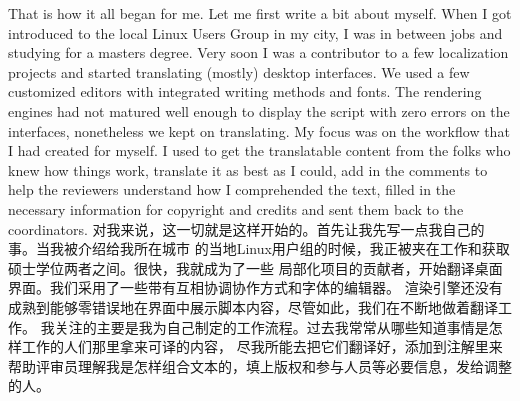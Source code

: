 That is how it all began for me. Let me first write a bit about myself. When I
got introduced to the local Linux Users Group in my city, I was in between jobs
and studying for a masters degree. Very soon I was a contributor to a few
localization projects and started translating (mostly) desktop interfaces. We
used a few customized editors with integrated writing methods and fonts. The
rendering engines had not matured well enough to display the script with zero
errors on the interfaces, nonetheless we kept on translating. My focus was on
the workflow that I had created for myself. I used to get the translatable
content from the folks who knew how things work, translate it as best as I
could, add in the comments to help the reviewers understand how I comprehended
the text, filled in the necessary information for copyright and credits and sent
them back to the coordinators.
对我来说，这一切就是这样开始的。首先让我先写一点我自己的事。当我被介绍给我所在城市
的当地Linux用户组的时候，我正被夹在工作和获取硕士学位两者之间。很快，我就成为了一些
局部化项目的贡献者，开始翻译桌面界面。我们采用了一些带有互相协调协作方式和字体的编辑器。
渲染引擎还没有成熟到能够零错误地在界面中展示脚本内容，尽管如此，我们在不断地做着翻译工作。
我关注的主要是我为自己制定的工作流程。过去我常常从哪些知道事情是怎样工作的人们那里拿来可译的内容，
尽我所能去把它们翻译好，添加到注解里来帮助评审员理解我是怎样组合文本的，填上版权和参与人员等必要信息，发给调整的人。
